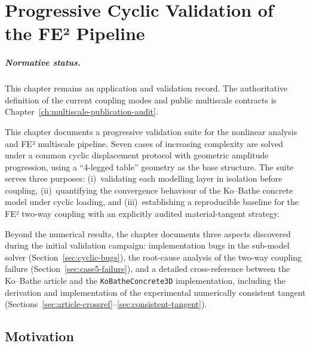 
\chapter{Progressive Cyclic Validation of the FE² Pipeline}
\label{ch:cyclic-validation}

\paragraph{Normative status.}
This chapter remains an application and validation record.  The authoritative
definition of the current coupling modes and public multiscale contracts is
Chapter~\ref{ch:multiscale-publication-audit}.

This chapter documents a progressive validation suite for the
nonlinear analysis and FE² multiscale pipeline.  Seven cases of
increasing complexity are solved under a common cyclic displacement
protocol with geometric amplitude progression, using a ``4-legged
table'' geometry as the base structure.  The suite serves three
purposes: (i)~validating each modelling layer in isolation before
coupling, (ii)~quantifying the convergence behaviour of the
Ko--Bathe concrete model under cyclic loading, and
(iii)~establishing a reproducible baseline for the FE² two-way
coupling with an explicitly audited material-tangent strategy.

Beyond the numerical results, the chapter documents three aspects
discovered during the initial validation campaign: implementation
bugs in the sub-model solver
(Section~\ref{sec:cyclic-bugs}), the root-cause analysis of the
two-way coupling failure (Section~\ref{sec:case5-failure}), and a
detailed cross-reference between the Ko--Bathe article and the
\texttt{KoBatheConcrete3D} implementation, including the derivation
and implementation of the experimental numerically consistent tangent
(Sections~\ref{sec:article-crossref}--\ref{sec:consistent-tangent}).


\section{Motivation}
\label{sec:cyclic-motivation}

